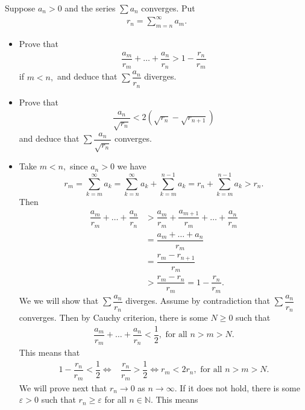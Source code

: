 \begin{problem}
Suppose $a_n>0$ and the series $\sum a_n$ converges. Put 
\begin{align*}
    r_n=\sum_{m=n}^\infty a_m.
\end{align*}
\begin{itemize}
    \item[(a)] Prove that 
    \begin{align*}
        \dfrac{a_m}{r_m}+\ldots+\dfrac{a_n}{r_n}>1-\dfrac{r_n}{r_m}
    \end{align*}
    if $m<n,$ and deduce that $\sum \dfrac{a_n}{r_n}$ diverges.
    \item[(b)] Prove that 
    \begin{align*}
        \dfrac{a_n}{\sqrt{r_n}}<2(\sqrt{r_n}-\sqrt{r_{n+1}})
    \end{align*}
    and deduce that $\sum\dfrac{a_n}{\sqrt{r_n}}$ converges.
\end{itemize}
\begin{solution}
\begin{itemize}
    \item[(a)] Take $m<n,$ since $a_n>0$ we have $$r_m=\sum_{k=m}^{\infty}a_k=\sum_{k=n}^{\infty}a_k+\sum_{k=m}^{n-1}a_k=r_n+\sum_{k=m}^{n-1}a_k>r_n.$$Then 
    \begin{align*}
          \dfrac{a_m}{r_m}+\ldots+\dfrac{a_n}{r_n}&>\dfrac{a_m}{r_m}+\dfrac{a_{m+1}}{r_m}+\ldots+\dfrac{a_n}{r_m}\\
          &=\dfrac{a_m+\ldots+a_n}{r_m}\\
          &=\dfrac{r_m-r_{n+1}}{r_m}\\ &>\dfrac{r_m-r_n}{r_m}=1-\dfrac{r_n}{r_m}.
    \end{align*}
    We we will show that $\sum\dfrac{a_n}{r_n}$ diverges. Assume by contradiction that $\sum\dfrac{a_n}{r_n}$ converges. Then by Cauchy criterion, there is some $N\ge 0$ such that \begin{align*}
        \dfrac{a_m}{r_m}+\ldots+\dfrac{a_n}{r_n}<\dfrac{1}{2},\text{ for all }n>m>N.
    \end{align*}
    This means that 
    \begin{align*}
        1-\dfrac{r_n}{r_m}<\dfrac{1}{2}\Longleftrightarrow&\dfrac{r_n}{r_m}>\dfrac{1}{2}\Longleftrightarrow r_m<2r_n,\text{ for all }n>m>N.
    \end{align*}
    We will prove next that $r_n\rightarrow 0$ as $n\rightarrow\infty.$ If it does not hold, there is some $\varepsilon>0$ such that $r_n \ge \varepsilon$ for all $n\in \mathbb{N}.$ This means 

\end{itemize}
\end{solution}
\end{problem}
